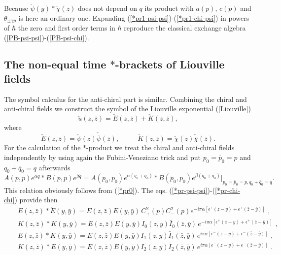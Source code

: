 \documentclass[a4paper,12pt]{article}
\begin{document}
Because $\check\psi(y)*\check\chi(z)$ does not depend on $q$ its
product with $a(p)$, $c(p)$ and $\theta_{\pm\gamma p}$ is here an
ordinary one.  Expanding (\ref{*pr1-psi-psi})-(\ref{*pr1-chi-psi}) in
powers of $\hbar$ the zero and first order terms in $\hbar$ reproduce
 the classical exchange algebra
(\ref{PB-psi-psi})-(\ref{PB-psi-chi}).



\subsection{The non-equal time $*$-brackets of Liouville  fields}


The symbol calculus for the anti-chiral part is similar.
Combining the chiral and anti-chiral fields we construct
the symbol of the Liouville exponential (\ref{Liouville})
\begin{equation}
\check u(z,\bar z)=\check E(z,\bar z)+\check K(z,\bar z),
\end{equation}
where
\begin{equation}\label{E,K}
\check E(z,\bar z)=\check \psi(z)\check {\bar\psi}(\bar z),~~~~~~~~~~~~
\check K(z,\bar z)=\check\chi(z)\check{\bar\chi}(\bar z).
\end{equation}
For the calculation of the $*$-product we treat the chiral and
anti-chiral fields independently  by using again the
Fubini-Veneziano trick and put $ p_0=\bar p_0=p$ and $q_0+\bar q_0=q$
afterwards
\begin{equation}\label{p=p_0}
A(p, p)e^{\alpha q}*B(p,p)e^{\beta q}=
A(p_0,\bar p_0)e^{\alpha(q_0+\bar q_o)}*
B(p_0,\bar p_0)e^{\beta(q_0+\bar q_o)}|_{p_0=\bar p_0=p, q_0+\bar q_0=q}.
\end{equation}
This relation obviously follows from (\ref{*pr0}).
The eqs. (\ref{*pr-psi-psi})-(\ref{*pr-chi-chi}) provide then
\begin{eqnarray}\label{E*E}
&&\check E(z,\bar z)*\check E(y,\bar y)=E(z,\bar z)E(y,\bar y)\,
C_+^2(p)C_-^2(p)e^{-i\pi\alpha[\epsilon^+(z-y)+\epsilon^+(\bar z-\bar y)]}\,\,, \\
\label{K*K}
&&K(z,\bar z)*K(y,\bar y)=E(z,\bar z)E(y,\bar y)
I_0(z,y)\bar I_0(\bar z,\bar y)\,
e^{-i\pi\alpha[\epsilon^+(z-y)+\epsilon^+(\bar z-\bar y)]}\,\,,\\
\label{E*K}
&&E(z,\bar z)*K(y,\bar y)=E(z,\bar z)E(y,\bar y)
I_1(z,y)\bar I_1(\bar z,\bar y)\,
e^{i\pi\alpha[\epsilon^-(z-y)+\epsilon^-(\bar z-\bar y)]}\,\,,\\
\label{K*E}
&&K(z,\bar z)*E(y,\bar y)=E(z,\bar z)E(y,\bar y)
I_2(z,y)\bar I_2(\bar z,\bar y)\,
e^{i\pi\alpha[\epsilon^-(z-y)+\epsilon^-(\bar z-\bar y)]}\,\,.
\end{eqnarray}
\end{document}
